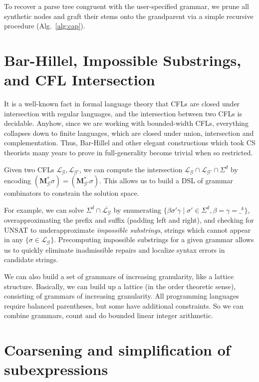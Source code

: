 \documentclass[sigplan,review,anonymous,acmsmall]{acmart}\settopmatter{printfolios=false,printccs=false,printacmref=false}
\begin{document}
    \noindent To recover a parse tree congruent with the user-specified grammar, we prune all synthetic nodes and graft their stems onto the grandparent via a simple recursive procedure (Alg.~\ref{alg:cap}).%

    

    \section{Bar-Hillel, Impossible Substrings, and CFL Intersection}

    It is a well-known fact in formal language theory that CFLs are closed under intersection with regular languages, and the intersection between two CFLs is decidable. Anyhow, since we are working with bounded-width CFLs, everything collapses down to finite languages, which are closed under union, intersection and complementation. Thus, Bar-Hillel and other elegant constructions which took CS theorists many years to prove in full-generality become trivial when so restricted.

    Given two CFLs $\mathcal{L}_\mathcal{G}, \mathcal{L}_{\mathcal{G}'}$, we can compute the intersection $\mathcal{L}_\mathcal{G}\cap\mathcal{L}_{\mathcal{G}'}\cap\Sigma^d$ by encoding $(\mathbf{M}_\mathcal{G}^*\sigma) = (\mathbf{M}_{\mathcal{G}'}^*\sigma)$. This allows us to build a DSL of grammar combinators to constrain the solution space.

    For example, we can solve $\Sigma^d \cap \overline{\mathcal{L}_\mathcal{G}}$ by enumerating $\{\beta\sigma'\gamma \mid \sigma' \in \Sigma^d, \beta = \gamma = \_^k\}$, overapproximating the prefix and suffix (padding left and right), and checking for UNSAT to underapproximate \textit{impossible substrings}, strings which cannot appear in any $\{\sigma \in \mathcal{L}_\mathcal{G}\}$. Precomputing impossible substrings for a given grammar allows us to quickly eliminate inadmissible repairs and localize syntax errors in candidate strings.

    We can also build a set of grammars of increasing granularity, like a lattice structure. Basically, we can build up a lattice (in the order theoretic sense), consisting of grammars of increasing granularity. All programming languages require balanced parentheses, but some have additional constraints. So we can combine grammars, count and do bounded linear integer arithmetic.

\section{Coarsening and simplification of subexpressions}
\end{document}
